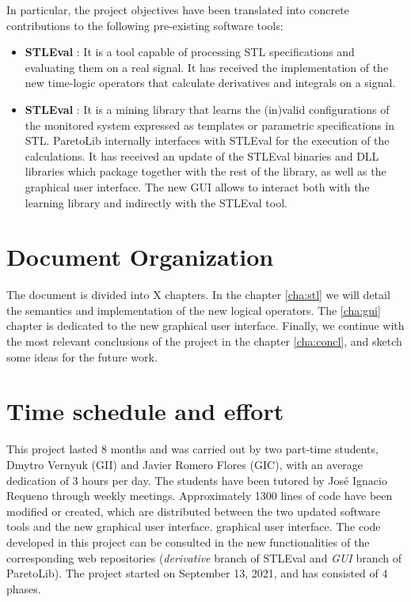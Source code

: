 In particular, the project objectives have been translated into concrete contributions to the following pre-existing software tools:

\begin{itemize}
\item \textbf{STLEval} \cite{StlEval}: It is a tool capable of processing STL specifications and evaluating them on a real signal. It has received the implementation of the new time-logic operators that calculate derivatives and integrals on a signal.
\item \textbf{STLEval} \cite{StlEval}: It is a mining library that learns the (in)valid configurations of the monitored system expressed as templates or parametric specifications in STL.
ParetoLib internally interfaces with STLEval for the execution of the calculations. It has received an update of the STLEval binaries and DLL libraries which package together with the rest of the library, as well as the graphical user interface. The new GUI allows to interact both with the learning library and indirectly with the STLEval tool.
\end{itemize}

\section{Document Organization}

The document is divided into X chapters. In the chapter \ref{cha:stl} we will detail the semantics and implementation of the new logical operators. The \ref{cha:gui} chapter is dedicated to the new graphical user interface. Finally, we continue with the most relevant conclusions of the project in the chapter \ref{cha:concl}, and sketch some ideas for the future work. %

\section{Time schedule and effort}
This project lasted 8 months and was carried out by two part-time students, Dmytro Vernyuk (GII) and Javier Romero Flores (GIC), with an average dedication of 3 hours per day. The students have been tutored by José Ignacio Requeno through weekly meetings. Approximately 1300 lines of code have been modified or created, which are distributed between the two updated software tools and the new graphical user interface.
graphical user interface. The code developed in this project can be consulted in the new functionalities of the corresponding web repositories (\textit{derivative} branch of STLEval and \textit{GUI} branch of ParetoLib). The project started on September 13, 2021, and has consisted of 4 phases.


